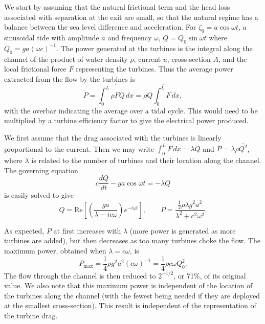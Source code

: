 \documentclass[11pt]{article}
\begin{document}
We start by assuming that the natural frictional term and the head loss associated with separation at the exit are small, so that the natural regime has a balance between the sea level difference and acceleration. For $\zeta_0 = a\cos\omega t$, a sinusoidal tide with amplitude $a$ and frequency $\omega$, $Q = Q_0 \sin\omega t$ where $Q_0 = ga(\omega c)^{-1}$. The power generated at the turbines is the integral along the channel of the product of water density $\rho$, current $u$, cross-section $A$, and the local frictional force $F$ representing the turbines. Thus the average power extracted from the flow by the turbines is
\begin{equation}
P = \overline {\int_0^L \rho F Q \, dx} = \rho \overline {Q \int_0^L F \, dx},
\end{equation}
with the overbar indicating the average over a tidal cycle. This would need to be multiplied by a turbine efficiency factor to give the electrical power produced.

We first assume that the drag associated with the turbines is linearly proportional to the current. Then we may write $\int_0^L F \, dx = \lambda Q$ and $P = \lambda \rho \overline {Q^2}$, where $\lambda$ is related to the number of turbines and their location along the channel.  The governing equation
\begin{equation}
c\frac{dQ}{dt} - g a \cos \omega t = -\lambda Q
\end{equation}
is easily solved to give
\begin{equation}
Q = \textrm{Re}\left[ \left(\frac{ga}{\lambda - ic\omega}\right)
e^{-i\omega t}\right],
\qquad P = \frac{{\frac{1}{2}}\rho\lambda g^2a^2}{\lambda^2 + c^2\omega^2}.
\end{equation}

As expected, $P$ at first increases with $\lambda$ (more power is generated as more turbines are added), but then decreases as too many turbines choke the flow. The maximum power, obtained when $\lambda = c\omega$, is
\begin{equation}
P_\textrm{max} = \frac{1}{4} \rho g^2 a^2 (c \omega)^{-1} = \frac{1}{4} \rho c\omega Q_0^2.
\end{equation}
The flow through the channel is then reduced to $2^{-{1/2}}$, or 71\%, of its original value. We also note that this maximum power is independent of the location of the turbines along the channel (with the fewest being needed if they are deployed at the smallest cross-section). This result is independent of the representation of the turbine drag.
\end{document}

